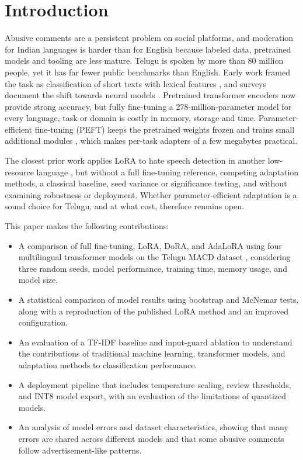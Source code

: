 \documentclass{svproc}
\begin{document}
\section{Introduction}
Abusive comments are a persistent problem on social platforms, and moderation for Indian languages is harder than for English because labeled data, pretrained models and tooling are less mature. Telugu is spoken by more than 80 million people, yet it has far fewer public benchmarks than English. Early work framed the task as classification of short texts with lexical features \cite{waseem2016,davidson2017}, and surveys document the shift towards neural models \cite{schmidt2017}. Pretrained transformer encoders \cite{vaswani2017,devlin2019bert} now provide strong accuracy, but fully fine-tuning a 278-million-parameter model for every language, task or domain is costly in memory, storage and time. Parameter-efficient fine-tuning (PEFT) keeps the pretrained weights frozen and trains small additional modules \cite{houlsby2019,hu2022lora}, which makes per-task adapters of a few megabytes practical.

The closest prior work applies LoRA to hate speech detection in another low-resource language \cite{kaunang2026indo}, but without a full fine-tuning reference, competing adaptation methods, a classical baseline, seed variance or significance testing, and without examining robustness or deployment. Whether parameter-efficient adaptation is a sound choice for Telugu, and at what cost, therefore remains open. 

\begingroup
\renewcommand{\labelitemi}{$\bullet$}
This paper makes the following contributions:
\begin{itemize}
    \item A comparison of full fine-tuning, LoRA, DoRA, and AdaLoRA using four multilingual transformer models on the Telugu MACD dataset \cite{gupta2022macd}, considering three random seeds, model performance, training time, memory usage, and model size.
    \item A statistical comparison of model results using bootstrap and McNemar tests, along with a reproduction of the published LoRA method \cite{kaunang2026indo} and an improved configuration.
    \item An evaluation of a TF-IDF baseline and input-guard ablation to understand the contributions of traditional machine learning, transformer models, and adaptation methods to classification performance.
    \item A deployment pipeline that includes temperature scaling, review thresholds, and INT8 model export, with an evaluation of the limitations of quantized models.
    \item An analysis of model errors and dataset characteristics, showing that many errors are shared across different models and that some abusive comments follow advertisement-like patterns.
\end{itemize}
\endgroup
\end{document}

